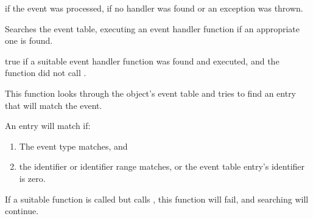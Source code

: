 


\true if the event was processed, \false if no handler was found or an
exception was thrown.




\label{wxevthandlersearcheventtable}


Searches the event table, executing an event handler function if an appropriate one
is found.





true if a suitable event handler function was found and executed, and the function did not
call .


This function looks through the object's event table and tries to find an entry
that will match the event.

An entry will match if:

\begin{enumerate}\itemsep=0pt
\item The event type matches, and
\item the identifier or identifier range matches, or the event table entry's identifier is zero.
\end{enumerate}

If a suitable function is called but calls , this function will
fail, and searching will continue.



\label{wxevthandlersetclientdata}


